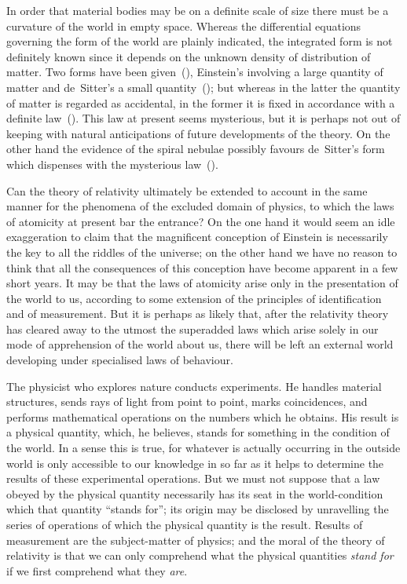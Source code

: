 \documentclass[12pt]{book}
\begin{document}
In order that material bodies may be on a definite scale of size there must
be a curvature of the world in empty space. Whereas the differential equations
governing the form of the world are plainly indicated, the integrated form is
not definitely known since it depends on the unknown density of distribution
of matter. Two forms have been given~(), Einstein's involving a large quantity
of matter and de~Sitter's a small quantity~(); but whereas in the latter the
quantity of matter is regarded as accidental, in the former it is fixed in accordance
with a definite law~(). This law at present seems mysterious, but it is
perhaps not out of keeping with natural anticipations of future developments
of the theory. On the other hand the evidence of the spiral nebulae possibly
favours de~Sitter's form which dispenses with the mysterious law~().

Can the theory of relativity ultimately be extended to account in the same
manner for the phenomena of the excluded domain of physics, to which the
laws of atomicity at present bar the entrance? On the one hand it would
seem an idle exaggeration to claim that the magnificent conception of Einstein
is necessarily the key to all the riddles of the universe; on the other hand we
have no reason to think that all the consequences of this conception have
become apparent in a few short years. It may be that the laws of atomicity
arise only in the presentation of the world to us, according to some extension
of the principles of identification and of measurement. But it is perhaps as
likely that, after the relativity theory has cleared away to the utmost the
superadded laws which arise solely in our mode of apprehension of the world
about us, there will be left an external world developing under specialised
laws of behaviour.

The physicist who explores nature conducts experiments. He handles
material structures, sends rays of light from point to point, marks coincidences,
and performs mathematical operations on the numbers which he obtains. His
result is a physical quantity, which, he believes, stands for something in the
condition of the world. In a sense this is true, for whatever is actually occurring
in the outside world is only accessible to our knowledge in so far as it
helps to determine the results of these experimental operations. But we must
not suppose that a law obeyed by the physical quantity necessarily has its seat
in the world-condition which that quantity ``stands for''; its origin may be
disclosed by unravelling the series of operations of which the physical quantity
is the result. Results of measurement are the subject-matter of physics; and
the moral of the theory of relativity is that we can only comprehend what the
physical quantities \emph{stand for} if we first comprehend what they \emph{are}.
\end{document}
